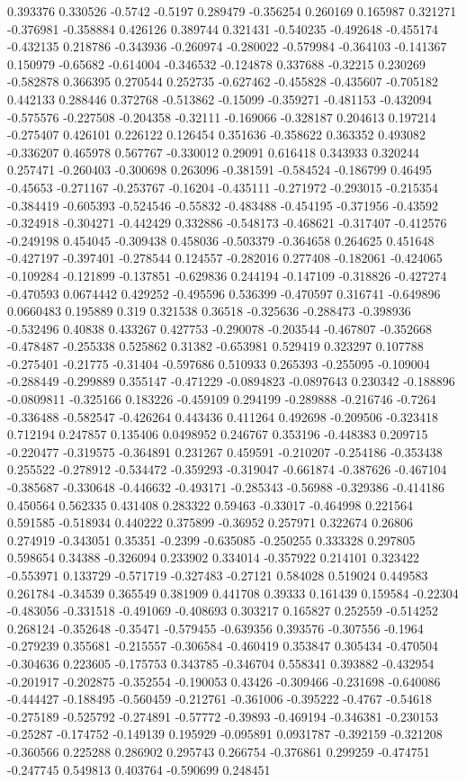 0.393376 0.330526 -0.5742 -0.5197 0.289479 -0.356254 0.260169 0.165987 0.321271 -0.376981 -0.358884 0.426126 0.389744 0.321431 -0.540235 -0.492648 -0.455174 -0.432135 0.218786 -0.343936 -0.260974 -0.280022 -0.579984 -0.364103 -0.141367 0.150979 -0.65682 -0.614004 -0.346532 -0.124878 0.337688 -0.32215 0.230269 -0.582878 0.366395 0.270544 0.252735 -0.627462 -0.455828 -0.435607 -0.705182 0.442133 0.288446 0.372768 -0.513862 -0.15099 -0.359271 -0.481153 -0.432094 -0.575576 -0.227508 -0.204358 -0.32111 -0.169066 -0.328187 0.204613 0.197214 -0.275407 0.426101 0.226122 0.126454 0.351636 -0.358622 0.363352 0.493082 -0.336207 0.465978 0.567767 -0.330012 0.29091 0.616418 0.343933 0.320244 0.257471 -0.260403 -0.300698 0.263096 -0.381591 -0.584524 -0.186799 0.46495 -0.45653 -0.271167 -0.253767 -0.16204 -0.435111 -0.271972 -0.293015 -0.215354 -0.384419 -0.605393 -0.524546 -0.55832 -0.483488 -0.454195 -0.371956 -0.43592 -0.324918 -0.304271 -0.442429 0.332886 -0.548173 -0.468621 -0.317407 -0.412576 -0.249198 0.454045 -0.309438 0.458036 -0.503379 -0.364658 0.264625 0.451648 -0.427197 -0.397401 -0.278544 0.124557 -0.282016 0.277408 -0.182061 -0.424065 -0.109284 -0.121899 -0.137851 -0.629836 0.244194 -0.147109 -0.318826 -0.427274 -0.470593 0.0674442 0.429252 -0.495596 0.536399 -0.470597 0.316741 -0.649896 0.0660483 0.195889 0.319 0.321538 0.36518 -0.325636 -0.288473 -0.398936 -0.532496 0.40838 0.433267 0.427753 -0.290078 -0.203544 -0.467807 -0.352668 -0.478487 -0.255338 0.525862 0.31382 -0.653981 0.529419 0.323297 0.107788 -0.275401 -0.21775 -0.31404 -0.597686 0.510933 0.265393 -0.255095 -0.109004 -0.288449 -0.299889 0.355147 -0.471229 -0.0894823 -0.0897643 0.230342 -0.188896 -0.0809811 -0.325166 0.183226 -0.459109 0.294199 -0.289888 -0.216746 -0.7264 -0.336488 -0.582547 -0.426264 0.443436 0.411264 0.492698 -0.209506 -0.323418 0.712194 0.247857 0.135406 0.0498952 0.246767 0.353196 -0.448383 0.209715 -0.220477 -0.319575 -0.364891 0.231267 0.459591 -0.210207 -0.254186 -0.353438 0.255522 -0.278912 -0.534472 -0.359293 -0.319047 -0.661874 -0.387626 -0.467104 -0.385687 -0.330648 -0.446632 -0.493171 -0.285343 -0.56988 -0.329386 -0.414186 0.450564 0.562335 0.431408 0.283322 0.59463 -0.33017 -0.464998 0.221564 0.591585 -0.518934 0.440222 0.375899 -0.36952 0.257971 0.322674 0.26806 0.274919 -0.343051 0.35351 -0.2399 -0.635085 -0.250255 0.333328 0.297805 0.598654 0.34388 -0.326094 0.233902 0.334014 -0.357922 0.214101 0.323422 -0.553971 0.133729 -0.571719 -0.327483 -0.27121 0.584028 0.519024 0.449583 0.261784 -0.34539 0.365549 0.381909 0.441708 0.39333 0.161439 0.159584 -0.22304 -0.483056 -0.331518 -0.491069 -0.408693 0.303217 0.165827 0.252559 -0.514252 0.268124 -0.352648 -0.35471 -0.579455 -0.639356 0.393576 -0.307556 -0.1964 -0.279239 0.355681 -0.215557 -0.306584 -0.460419 0.353847 0.305434 -0.470504 -0.304636 0.223605 -0.175753 0.343785 -0.346704 0.558341 0.393882 -0.432954 -0.201917 -0.202875 -0.352554 -0.190053 0.43426 -0.309466 -0.231698 -0.640086 -0.444427 -0.188495 -0.560459 -0.212761 -0.361006 -0.395222 -0.4767 -0.54618 -0.275189 -0.525792 -0.274891 -0.57772 -0.39893 -0.469194 -0.346381 -0.230153 -0.25287 -0.174752 -0.149139 0.195929 -0.095891 0.0931787 -0.392159 -0.321208 -0.360566 0.225288 0.286902 0.295743 0.266754 -0.376861 0.299259 -0.474751 -0.247745 0.549813 0.403764 -0.590699 0.248451 